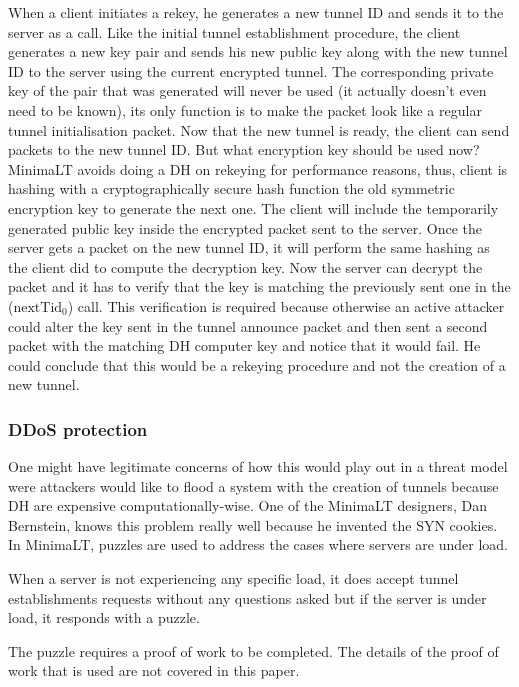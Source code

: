 \documentclass{vldb}
\begin{document}
When a client initiates a rekey, he generates a new tunnel ID and sends it to the server as a call. Like the initial tunnel establishment procedure, the client generates a new key pair and sends his new public key along with the new tunnel ID to the server using the current encrypted tunnel. The corresponding private key of the pair that was generated will never be used (it actually doesn't even need to be known), its only function is to make the packet look like a regular tunnel initialisation packet. Now that the new tunnel is ready, the client can send packets to the new tunnel ID. But what encryption key should be used now? MinimaLT avoids doing a DH on rekeying for performance reasons, thus, client is hashing with a cryptographically secure hash function the old symmetric encryption key to generate the next one. The client will include the temporarily generated public key inside the encrypted packet sent to the server. Once the server gets a packet on the new tunnel ID, it will perform the same hashing as the client did to compute the decryption key. Now the server can decrypt the packet and it has to verify that the key is matching the previously sent one in the (\emph{$\text{nextTid}_{0}$}) call. This verification is required\cite{MinimaLT} because otherwise an active attacker could alter the key sent in the tunnel announce packet and then sent a second packet with the matching DH computer key and notice that it would fail. He could conclude that this would be a rekeying procedure and not the creation of a new tunnel.


\subsubsection{DDoS protection}

One might have legitimate concerns of how this would play out in a threat model were attackers would like to flood a system with the creation of tunnels because DH are expensive computationally-wise. One of the MinimaLT designers, Dan Bernstein, knows this problem really well because he invented the SYN cookies. In MinimaLT, puzzles are used to address the cases where servers are under load.

When a server is not experiencing any specific load, it does accept tunnel establishments requests without any questions asked but if the server is under load, it responds with a puzzle.

The puzzle requires a proof of work to be completed. The details of the proof of work that is used are not covered in this paper.
\end{document}
